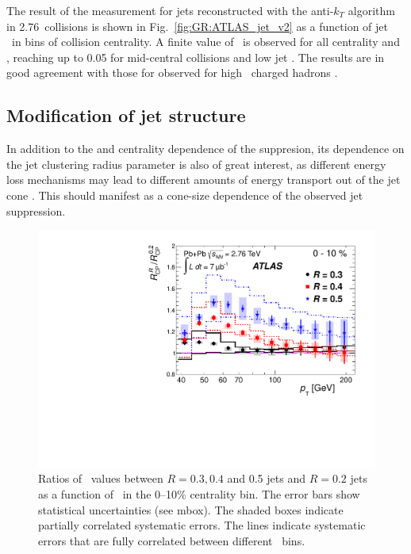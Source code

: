 The result of the \vtwo measurement for jets reconstructed with the anti-$k_T$ 
algorithm in 2.76\TeV \PbPb\ collisions is shown in Fig.~\ref{fig:GR:ATLAS_jet_v2}
as a function of jet \pt\ in bins of collision centrality. A finite
value of \vtwo\ is observed for all centrality and \pt, reaching up to 0.05 for
mid-central collisions and low jet \pt. The results are in good agreement
with those for observed for high \pt\ charged hadrons \cite{Chatrchyan:2012xq}.

\subsection{Modification of jet structure}

In addition to the \pt and centrality dependence of the suppresion, its dependence on the 
jet clustering radius parameter is also of great interest, as different energy loss 
mechanisms may lead to different amounts of energy transport out of the jet cone
\cite{Vitev:2008rz, Vitev:2009rd,He:2011pd}. This should manifest as a cone-size 
dependence of the observed jet suppression.
\begin{figure}[!h]
\begin{center}
\includegraphics[width=0.49\mboxwidth]{jetfigures/ATLAS_jetRCP_size.pdf}
\caption{
Ratios of \Rcp\ values between $R = 0.3, 0.4$ and 0.5 jets and $R =
0.2$ jets as a function of \pT\ in the 0--10\% centrality bin. The
error bars show statistical uncertainties (see mbox). The shaded boxes
indicate partially correlated systematic errors. The lines indicate
systematic errors that are fully correlated between different \pT\ bins.
}
\label{fig:GR:ATLAS_jetRCP_size}
\end{center}
\end{figure}

